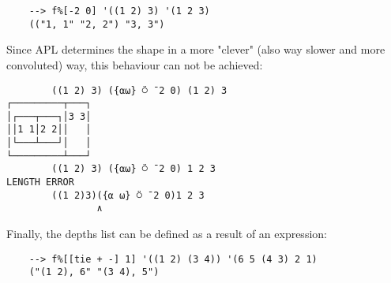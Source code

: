 \begin{Verbatim}
    --> f%[-2 0] '((1 2) 3) '(1 2 3)
    (("1, 1" "2, 2") "3, 3")
\end{Verbatim}

Since APL determines the shape in a more "clever" (also way slower and more convoluted) way, this behaviour can not be achieved:

\begin{Verbatim}
        ((1 2) 3) ({⍺⍵} ⍥ ¯2 0) (1 2) 3
┌─────────┬───┐
│┌───┬───┐│3 3│
││1 1│2 2││   │
│└───┴───┘│   │
└─────────┴───┘
        ((1 2) 3) ({⍺⍵} ⍥ ¯2 0) 1 2 3
LENGTH ERROR
        ((1 2)3)({⍺ ⍵} ⍥ ¯2 0)1 2 3
                ∧
\end{Verbatim}

Finally, the depths list can be defined as a result of an expression:

\begin{Verbatim}
    --> f%[[tie + -] 1] '((1 2) (3 4)) '(6 5 (4 3) 2 1)
    ("(1 2), 6" "(3 4), 5")
\end{Verbatim}
